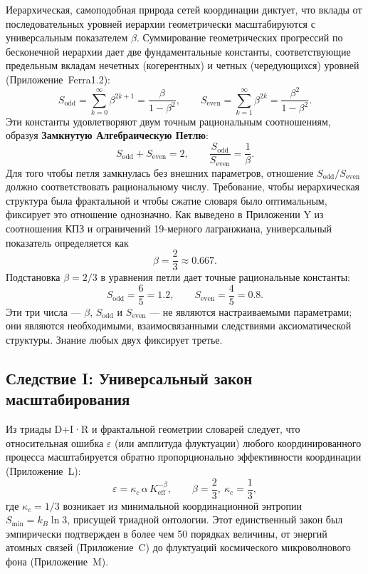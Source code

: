 \documentclass[11pt,a4paper]{article}
\begin{document}
	Иерархическая, самоподобная природа сетей координации диктует, что вклады от последовательных уровней иерархии геометрически масштабируются с универсальным показателем \(\beta\). Суммирование геометрических прогрессий по бесконечной иерархии дает две фундаментальные константы, соответствующие предельным вкладам нечетных (когерентных) и четных (чередующихся) уровней (Приложение~Ferra1.2):
	\[
	S_{\mathrm{odd}} = \sum_{k=0}^{\infty} \beta^{2k+1} = \frac{\beta}{1-\beta^{2}}, \qquad
	S_{\mathrm{even}} = \sum_{k=1}^{\infty} \beta^{2k} = \frac{\beta^{2}}{1-\beta^{2}}.
	\]
	Эти константы удовлетворяют двум точным рациональным соотношениям, образуя \textbf{Замкнутую Алгебраическую Петлю}:
	\[
	\boxed{S_{\mathrm{odd}} + S_{\mathrm{even}} = 2, \qquad \frac{S_{\mathrm{odd}}}{S_{\mathrm{even}}} = \frac{1}{\beta}}.
	\]
	Для того чтобы петля замкнулась без внешних параметров, отношение \(S_{\mathrm{odd}}/S_{\mathrm{even}}\) должно соответствовать рациональному числу. Требование, чтобы иерархическая структура была фрактальной и чтобы сжатие словаря было оптимальным, фиксирует это отношение однозначно. Как выведено в Приложении Y из соотношения КПЗ и ограничений 19-мерного лагранжиана, универсальный показатель определяется как
	\[
	\beta = \frac{2}{3} \approx 0.667.
	\]
	Подстановка \(\beta = 2/3\) в уравнения петли дает точные рациональные константы:
	\[
	S_{\mathrm{odd}} = \frac{6}{5} = 1.2,\qquad S_{\mathrm{even}} = \frac{4}{5} = 0.8.
	\]
	Эти три числа — \(\beta\), \(S_{\mathrm{odd}}\) и \(S_{\mathrm{even}}\) — не являются настраиваемыми параметрами; они являются необходимыми, взаимосвязанными следствиями аксиоматической структуры. Знание любых двух фиксирует третье.
	
	\subsection{Следствие I: Универсальный закон масштабирования}
	\label{subsec:consequence-scaling}
	
	Из триады D+I·R и фрактальной геометрии словарей следует, что относительная ошибка \(\varepsilon\) (или амплитуда флуктуации) любого координированного процесса масштабируется обратно пропорционально эффективности координации (Приложение~L):
	\[
	\boxed{\varepsilon = \kappa_c \, \alpha \, K_{\mathrm{eff}}^{-\beta}, \qquad \beta = \frac{2}{3},\ \kappa_c = \frac{1}{3}},
	\]
	где \(\kappa_c = 1/3\) возникает из минимальной координационной энтропии \(S_{\min} = k_B \ln 3\), присущей триадной онтологии. Этот единственный закон был эмпирически подтвержден в более чем 50 порядках величины, от энергий атомных связей (Приложение~C) до флуктуаций космического микроволнового фона (Приложение~M).
	
\end{document}

